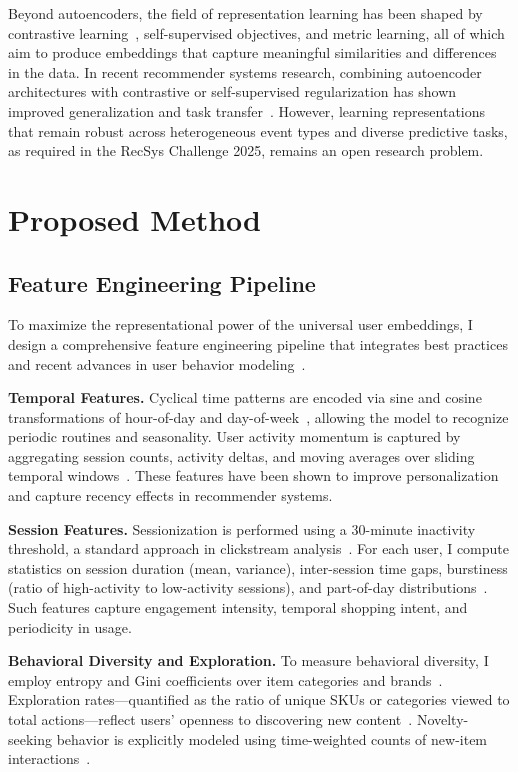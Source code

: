 \documentclass[sigconf]{acmart}
\begin{document}
Beyond autoencoders, the field of representation learning has been shaped by contrastive learning~\cite{Oord2018, Chen2020SimCLR}, self-supervised objectives, and metric learning, all of which aim to produce embeddings that capture meaningful similarities and differences in the data. In recent recommender systems research, combining autoencoder architectures with contrastive or self-supervised regularization has shown improved generalization and task transfer~\cite{Zhou2020S3Rec, Zhan2022CLAES}. However, learning representations that remain robust across heterogeneous event types and diverse predictive tasks, as required in the RecSys Challenge 2025, remains an open research problem.

\section{Proposed Method}
\label{sec:method}

\subsection{Feature Engineering Pipeline}

To maximize the representational power of the universal user embeddings, I design a comprehensive feature engineering pipeline that integrates best practices and recent advances in user behavior modeling~\cite{Quadrana2018, Christoffel2022, Covington2016, Rendle2010, Hidasi2016, Wang2019}.

\textbf{Temporal Features.}
Cyclical time patterns are encoded via sine and cosine transformations of hour-of-day and day-of-week~\cite{Laptev2017}, allowing the model to recognize periodic routines and seasonality. User activity momentum is captured by aggregating session counts, activity deltas, and moving averages over sliding temporal windows~\cite{Quadrana2018}. These features have been shown to improve personalization and capture recency effects in recommender systems.

\textbf{Session Features.}
Sessionization is performed using a 30-minute inactivity threshold, a standard approach in clickstream analysis~\cite{Yang2020, Quadrana2017}. For each user, I compute statistics on session duration (mean, variance), inter-session time gaps, burstiness (ratio of high-activity to low-activity sessions), and part-of-day distributions~\cite{Christoffel2022}. Such features capture engagement intensity, temporal shopping intent, and periodicity in usage.

\textbf{Behavioral Diversity and Exploration.}
To measure behavioral diversity, I employ entropy and Gini coefficients over item categories and brands~\cite{Rendle2010}. Exploration rates—quantified as the ratio of unique SKUs or categories viewed to total actions—reflect users’ openness to discovering new content~\cite{Cui2018}. Novelty-seeking behavior is explicitly modeled using time-weighted counts of new-item interactions~\cite{Zhao2019}.
\end{document}
